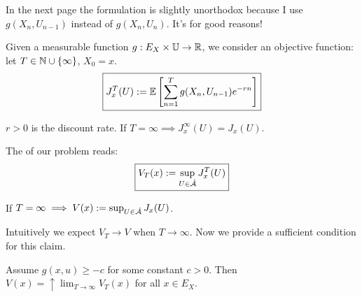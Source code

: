 \begin{remark*}
    In the next page the formulation is slightly unorthodox because I use $g(X_n, U_{n-1})$ instead of $g(X_n, U_n)$. It's for good reasons!
\end{remark*}



Given a measurable function $g: E_X \times \mathbb{U} \to \mathbb R$, we consider an objective function: let $T \in \mathbb N \cup \{\infty\}$, $X_0 = x$.
\begin{equation*}
    \boxed{J_x^T(U) := \mathbb E \left[ \sum_{n=1}^T g(X_n, U_{n-1}) e^{-rn} \right]}
\end{equation*}
\begin{remark*}
    $r > 0$ is the discount rate. If $T = \infty \implies J_x^\infty(U) = J_x(U)$.
\end{remark*}

The  of our problem reads:
\begin{equation*}
    \boxed{V_T(x) := \sup_{U \in \hat{\mathcal{A}}} J_x^T(U)}
\end{equation*}
\begin{remark*}
    If $T = \infty \implies V(x) := \sup_{U \in \hat{\mathcal{A}}} J_x(U)$.
\end{remark*}

\begin{remark}
    Intuitively we expect $V_T \to V$ when $T \to \infty$. Now we provide a sufficient condition for this claim.
\end{remark}

\begin{lemma}
    Assume $g(x,u) \geq -c$ for some constant $c > 0$. Then $V(x) = \uparrow \lim_{T \to \infty} V_T(x)$ for all $x \in E_X$.
\end{lemma}

